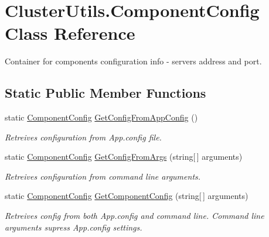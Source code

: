 \hypertarget{class_cluster_utils_1_1_component_config}{}\section{Cluster\+Utils.\+Component\+Config Class Reference}
\label{class_cluster_utils_1_1_component_config}


Container for components\textquotesingle{} configuration info -\/ server\textquotesingle{}s address and port.  


\subsection*{Static Public Member Functions}
\begin{DoxyCompactItemize}
\item 
static \hyperlink{class_cluster_utils_1_1_component_config}{Component\+Config} \hyperlink{class_cluster_utils_1_1_component_config_ae36297e732a493febbf8aa40c053adec}{Get\+Config\+From\+App\+Config} ()
\begin{DoxyCompactList}\small\item\em Retreives configuration from App.\+config file. \end{DoxyCompactList}\item 
static \hyperlink{class_cluster_utils_1_1_component_config}{Component\+Config} \hyperlink{class_cluster_utils_1_1_component_config_ac42b1e1da19f5ed827390e415e15ac0e}{Get\+Config\+From\+Args} (string\mbox{[}$\,$\mbox{]} arguments)
\begin{DoxyCompactList}\small\item\em Retreives configuration from command line arguments. \end{DoxyCompactList}\item 
static \hyperlink{class_cluster_utils_1_1_component_config}{Component\+Config} \hyperlink{class_cluster_utils_1_1_component_config_a5b2af6e5713a53c6cdaaf5da8d3231c5}{Get\+Component\+Config} (string\mbox{[}$\,$\mbox{]} arguments)
\begin{DoxyCompactList}\small\item\em Retreives config from both App.\+config and command line. Command line arguments supress App.\+config settings. \end{DoxyCompactList}\end{DoxyCompactItemize}
